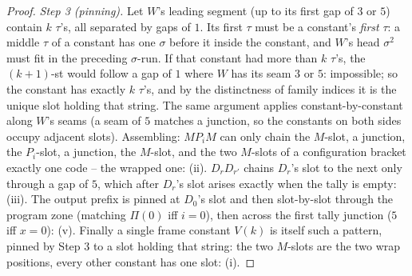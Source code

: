 \begin{proof}
    \emph{Step 3 (pinning).} Let $W$'s leading segment (up to its
    first gap of $3$ or $5$) contain $k$ $\tau$'s, all separated by
    gaps of $1$. Its first $\tau$ must be a constant's \emph{first}
    $\tau$: a middle $\tau$ of a constant has one $\sigma$ before it
    inside the constant, and $W$'s head $\sigma^2$ must fit in the
    preceding $\sigma$-run. If that constant had more than $k$ $\tau$'s,
    the $(k{+}1)$-st would follow a gap of $1$ where $W$ has its seam
    $3$ or $5$: impossible; so the constant has exactly $k$ $\tau$'s,
    and by the distinctness of family indices it is the unique slot
    holding that string. The same argument applies constant-by-constant
    along $W$'s seams (a seam of $5$ matches a junction, so the
    constants on both sides occupy adjacent slots). Assembling:
    $M P_i M$ can only chain the $M$-slot, a junction, the $P_i$-slot,
    a junction, the $M$-slot, and the two $M$-slots of a configuration
    bracket exactly one code -- the wrapped one: (ii). $D_r D_{r'}$
    chains $D_r$'s slot to the next only through a gap of $5$, which
    after $D_r$'s slot arises exactly when the tally is empty: (iii).
    The output prefix is pinned at $D_0$'s slot and then slot-by-slot
    through the program zone (matching $\Pi(0)$ iff $i = 0$), then
    across the first tally junction ($5$ iff $x = 0$): (v). Finally a
    single frame constant $V(k)$ is itself such a pattern, pinned by
    Step 3 to a slot holding that string: the two $M$-slots are the two
    wrap positions, every other constant has one slot: (i).
\end{proof}

